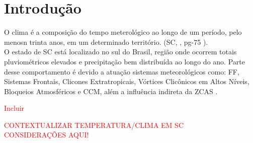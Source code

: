 \chapter{Introdução}

\indent O clima é a composição do tempo meterológico ao longo de um período, pelo menosn trinta anos, em um determinado território. (\acrlong{SC}, \citeyear{AtlasSCnatureza}, pg-75 ).\\
\indent O estado de \acrfull{SC} está localizado no sul do Brasil, região onde ocorrem totais pluviométricos elevados e precipitação bem distribuída ao longo do ano. Parte desse comportamento é devido a atuação sistemas meteorológicos como: \acrfull{FF}, Sistemas Frontais, Clicones Extratropicais, Vórtices Clicônicos em Altos Níveis, Bloqueios Atmosféricos e \acrfull{CCM}, além a influência indireta da \acrfull{ZCAS} \cite{reboita2010}.\\
\begin{center}
\textcolor{red}{Incluir \cite{Guerra2023Regionalizacao}}
\end{center}
\textcolor{red}{CONTEXTUALIZAR TEMPERATURA/CLIMA EM SC}\\
\textcolor{red}{CONSIDERAÇÕES AQUI!}\\ 

